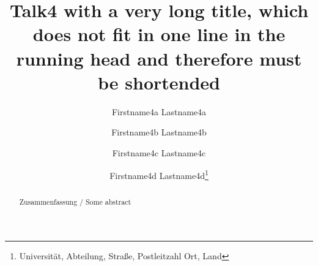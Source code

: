 \documentclass[english]{lni}
\begin{document}
\title[Talk4]{Talk4 with a very long title, which does not fit in one line in the running head and therefore must be shortended}
\author[Firstname4a Lastname4a et al.]
{Firstname4a Lastname4a \and Firstname4b Lastname4b \and Firstname4c Lastname4c \and Firstname4d Lastname4d\footnote{Universität, Abteilung, Straße, Postleitzahl Ort,
Land }}
\maketitle

\begin{abstract}
Zusammenfassung / Some abstract
\end{abstract}
\blinddocument
\end{document}
